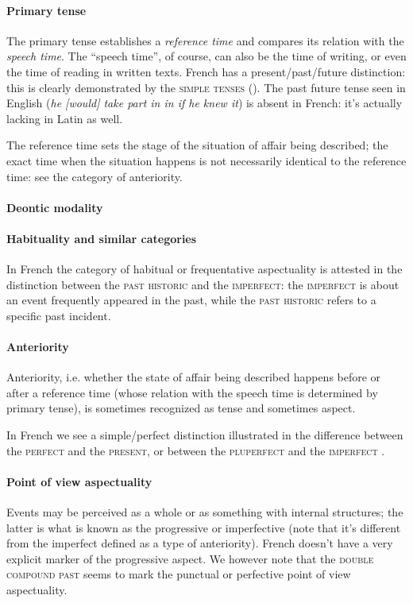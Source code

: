 \documentclass[a4paper, oneside, 12pt]{report}
\newcommand*{\citepage}[1]{p.~{#1}}
\newcommand{\form}[1]{\emph{#1}}
\newcommand*{\category}[1]{\textsc{#1}}
\begin{document}
\paragraph*{Primary tense}
The primary tense establishes a \emph{reference time}
and compares its relation with the \emph{speech time}.
The ``speech time'', of course, can also be the time of writing,
or even the time of reading in written texts. 
French has a present/past/future distinction:
this is clearly demonstrated by the \category{simple tenses}
(). 
The past future tense seen in English (\form{he [would] take part in in if he knew it})
is absent in French: it's actually lacking in Latin as well.

The reference time sets the stage of the situation of affair being described;
the exact time when the situation happens is not necessarily identical to the reference time:
see the category of anteriority. 

\paragraph*{Deontic modality}

\paragraph*{Habituality and similar categories}
In French the category of habitual or frequentative aspectuality is attested
in the distinction between the \category{past historic} and the \category{imperfect}:
the \category{imperfect} is about an event frequently appeared in the past,
while the \category{past historic} refers to a specific past incident.

\paragraph*{Anteriority}
Anteriority, i.e. whether the state of affair being described
happens before or after a reference time 
(whose relation with the speech time is determined by primary tense),
is sometimes recognized as tense and sometimes aspect.

In French we see a simple/perfect distinction illustrated
in the difference between the \category{perfect} and the \category{present},
or between the \category{pluperfect} and the \category{imperfect}
\citep[\citepage{148}]{l1999advanced}.

\paragraph*{Point of view aspectuality}
Events may be perceived as a whole or as something with internal structures;
the latter is what is known as the progressive or imperfective
(note that it's different from the imperfect defined as a type of anteriority).
French doesn't have a very explicit marker of the progressive aspect.
We however note that the \category{double compound past} \citep[\citepage{152}]{l1999advanced}
seems to mark the punctual or perfective point of view aspectuality.
\end{document}
